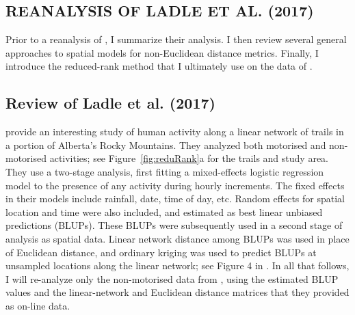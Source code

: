\documentclass[11pt, titlepage]{article}\usepackage[]{graphicx}\usepackage[]{color}
\begin{document}
\begin{spacing}{1.9}
\begin{flushleft}




\section*{REANALYSIS OF LADLE ET AL. (2017)}

Prior to a reanalysis of \citet{Ladl:Avga:Whea:Boyc:pred:2016}, I summarize their analysis.  I then review several general approaches to spatial models for non-Euclidean distance metrics. Finally, I introduce the reduced-rank method that I ultimately use on the data of \citet{Ladl:Avga:Whea:Boyc:pred:2016}.

\subsection*{Review of Ladle et al. (2017)}

\citet{Ladl:Avga:Whea:Boyc:pred:2016} provide an interesting study of human activity along a linear network of trails in a portion of Alberta's Rocky Mountains.  They analyzed both motorised and non-motorised activities; see Figure~\ref{fig:reduRank}a for the trails and study area.  They use a two-stage analysis, first fitting a mixed-effects logistic regression model to the presence of any activity during hourly increments.  The fixed effects in their models include rainfall, date, time of day, etc.  Random effects for spatial location and time were also included, and estimated as best linear unbiased predictions (BLUPs). These BLUPs were subsequently used in a second stage of analysis as spatial data.  Linear network distance among BLUPs was used in place of Euclidean distance, and ordinary kriging was used to predict BLUPs at unsampled locations along the linear network; see Figure 4 in \citet{Ladl:Avga:Whea:Boyc:pred:2016}. In all that follows, I will re-analyze only the non-motorised data from \citet{Ladl:Avga:Whea:Boyc:pred:2016}, using the estimated BLUP values and the linear-network and Euclidean distance matrices that they provided as on-line data. 


\end{flushleft}
\end{spacing}
\end{document}
